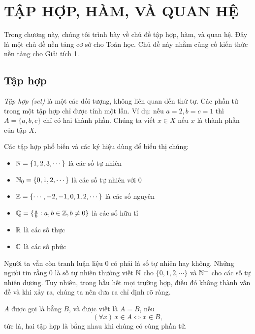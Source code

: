 \chapter{TẬP HỢP, HÀM, VÀ QUAN HỆ}

Trong chương này, chúng tôi trình bày về chủ đề tập hợp, hàm, và quan hệ. Đây là một chủ đề nền tảng cơ sở cho Toán học. Chủ đề này nhằm củng cố kiến thức nền tảng cho Giải tích 1.

\section{Tập hợp}

\begin{defi}
  \emph{Tập hợp (set)} là một các đối tượng, không liên quan đến thứ tự. Các phần tử trong một tập hợp chỉ được tính một lần. Ví dụ: nếu $a = 2, b = c = 1$ thì $A = \{a, b, c\}$ chỉ có hai thành phần. Chúng ta viết $x\in X$ nếu $x$ là thành phần của tập $X$.
\end{defi}

\begin{eg}
  Các tập hợp phổ biến và các ký hiệu dùng để biểu thị chúng:
  \begin{itemize}
    \item $\mathbb{N} = \{1, 2, 3, \cdots \}$ là các số tự nhiên
    \item $\mathbb{N}_0 = \{0, 1, 2, \cdots \}$ là các số tự nhiên với $0$
    \item $\mathbb{Z} = \{\cdots, -2, -1, 0, 1, 2, \cdots \}$ là các số nguyên
    \item $\mathbb{Q} = \{\frac{a}{b}: a, b\in \mathbb{Z}, b \not= 0\}$ là các số hữu tỉ
    \item $\mathbb{R}$ là các số thực
    \item $\mathbb{C}$ là các số phức
  \end{itemize}
  Người ta vẫn còn tranh luận liệu $0$ có phải là số tự nhiên hay không. Những người tin rằng $0$ là số tự nhiên thường viết $\mathbb{N}$ cho $\{0, 1, 2, \cdots\}$ và $\mathbb{N}^+$ cho các số tự nhiên dương. Tuy nhiên, trong hầu hết mọi trường hợp, điều đó không thành vấn đề và khi xảy ra, chúng ta nên đưa ra chỉ định rõ ràng.
\end{eg}
\begin{defi}
  $A$ được gọi là bằng $B$, và được viết là $A = B$, nếu
  \[
    (\forall x)\,x\in A \Leftrightarrow x\in B,
  \]
  tức là, hai tập hợp là bằng nhau khi chúng có cùng phần tử.
\end{defi}

